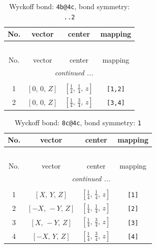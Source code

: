 \documentclass[fleqn,8pt]{jsarticle}
\begin{document}
\renewcommand{\arraystretch}{1.2}
\begin{longtable}{cccc}
\caption{Wyckoff bond: {\tt 4b@4c}, bond symmetry: {\tt ..2}}
 \\
 \hline \hline
No. & vector & center & mapping \\ \hline \endfirsthead

\multicolumn{3}{l}{\tablename\ \thetable{}} \\
 \hline \hline
No. & vector & center & mapping \\ \hline \endhead

 \hline \hline
\multicolumn{3}{r}{\footnotesize\it continued ...} \\ \endfoot

 \hline \hline
\multicolumn{3}{r}{} \\ \endlastfoot

1 & $\left[ 0,\, 0,\, Z \right]$ & $\left[ \frac{1}{4},\, \frac{1}{4},\, z \right]$ & {\tt [1,2]} \\ \hline
2 & $\left[ 0,\, 0,\, Z \right]$ & $\left[ \frac{1}{4},\, \frac{3}{4},\, z \right]$ & {\tt [3,4]} \\
\end{longtable}
\renewcommand{\arraystretch}{1.2}
\begin{longtable}{cccc}
\caption{Wyckoff bond: {\tt 8c@4c}, bond symmetry: {\tt 1}}
 \\
 \hline \hline
No. & vector & center & mapping \\ \hline \endfirsthead

\multicolumn{3}{l}{\tablename\ \thetable{}} \\
 \hline \hline
No. & vector & center & mapping \\ \hline \endhead

 \hline \hline
\multicolumn{3}{r}{\footnotesize\it continued ...} \\ \endfoot

 \hline \hline
\multicolumn{3}{r}{} \\ \endlastfoot

1 & $\left[ X,\, Y,\, Z \right]$ & $\left[ \frac{1}{4},\, \frac{1}{4},\, z \right]$ & {\tt [1]} \\ \hline
2 & $\left[ - X,\, - Y,\, Z \right]$ & $\left[ \frac{1}{4},\, \frac{1}{4},\, z \right]$ & {\tt [2]} \\ \hline
3 & $\left[ X,\, - Y,\, Z \right]$ & $\left[ \frac{1}{4},\, \frac{3}{4},\, z \right]$ & {\tt [3]} \\ \hline
4 & $\left[ - X,\, Y,\, Z \right]$ & $\left[ \frac{1}{4},\, \frac{3}{4},\, z \right]$ & {\tt [4]} \\
\end{longtable}
\end{document}
